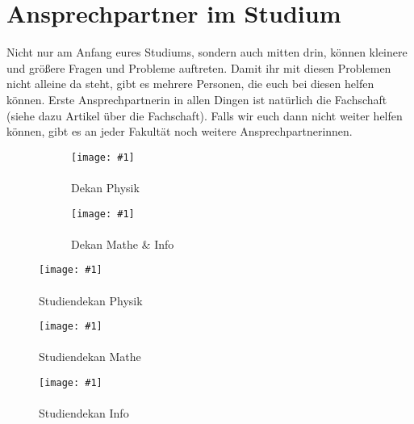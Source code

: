 \section*{Ansprechpartner im Studium}

Nicht nur am Anfang eures Studiums, sondern auch mitten drin, können kleinere und größere Fragen und Probleme auftreten. Damit ihr mit diesen Problemen nicht alleine da steht, gibt es mehrere Personen, die euch bei diesen helfen können. Erste Ansprechpartnerin in allen Dingen ist natürlich die Fachschaft (siehe dazu Artikel über die Fachschaft). Falls wir euch dann nicht weiter helfen können, gibt es an jeder Fakultät noch weitere Ansprechpartnerinnen.

\newcommand{\proffoto}[2]{
    \centering
    \texttt{[image: \#1]}\\
    #2
    \vspace{4mm}
}

\begin{figure}[b]
\begin{subfigure}{.48\linewidth}
    \ifdefined\dekanphysikfoto
    \proffoto{\dekanphysikfoto}{\dekanphysiklang\\[-1ex]{\scriptsize Dekan Physik}}
    \fi

\end{subfigure}
\begin{subfigure}{.48\linewidth}
    \ifdefined\dekanmathefoto
	\proffoto{\dekanmathefoto}{\dekanmathelang\\[-1ex]{\scriptsize Dekan Mathe \& Info}}
    \fi

\end{subfigure}
\end{figure}

\begin{figure*}
\centering
\begin{subfigure}{.3\linewidth}
    \ifdefined\studiendekanphysikfoto
    \proffoto{\studiendekanphysikfoto}{\studiendekanphysik\\[-1ex]{\scriptsize Studiendekan Physik}}
    \fi
\end{subfigure}
\begin{subfigure}{.3\linewidth}
    \ifdefined\studiendekanmathefoto
    \proffoto{\studiendekanmathefoto}{\studiendekanmathe\\[-1ex]{\scriptsize Studiendekan Mathe}}
    \fi
\end{subfigure}
\begin{subfigure}{.3\linewidth}
    \ifdefined\studiendekaninformatikfoto
    \proffoto{\studiendekaninformatikfoto}{\studiendekaninformatik\\[-1ex]{\scriptsize Studiendekan Info}}
    \fi
\end{subfigure}
\end{figure*}


